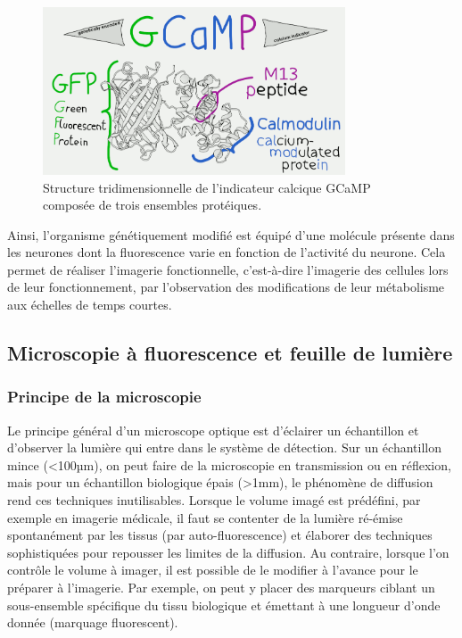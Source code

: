 \begin{figure}
\centering
\includegraphics[width=0.8\textwidth]{./files/GCaMP.png}
\caption{Structure tridimensionnelle de l'indicateur calcique GCaMP composée de trois ensembles protéiques.}
\end{figure}

Ainsi, l'organisme génétiquement modifié est équipé d'une molécule présente dans les neurones dont la fluorescence varie en fonction de l'activité du neurone. Cela permet de réaliser l'imagerie fonctionnelle, c'est-à-dire l'imagerie des cellules lors de leur fonctionnement, par l'observation des modifications de leur métabolisme aux échelles de temps courtes. 

\subsection{Microscopie à fluorescence et feuille de lumière}

\subsubsection{Principe de la microscopie}

Le principe général d'un microscope optique est d'éclairer un échantillon et d'observer la lumière qui entre dans le système de détection. Sur un échantillon mince (<100µm), on peut faire de la microscopie en transmission ou en réflexion, mais pour un échantillon biologique épais (>1mm), le phénomène de diffusion rend ces techniques inutilisables. Lorsque le volume imagé est prédéfini, par exemple en imagerie médicale, il faut se contenter de la lumière ré-émise spontanément par les tissus (par auto-fluorescence) et élaborer des techniques sophistiquées pour repousser les limites de la diffusion. Au contraire, lorsque l'on contrôle le volume à imager, il est possible de le modifier à l'avance pour le préparer à l'imagerie. Par exemple, on peut y placer des marqueurs ciblant un sous-ensemble spécifique du tissu biologique et émettant à une longueur d'onde donnée (marquage fluorescent).

